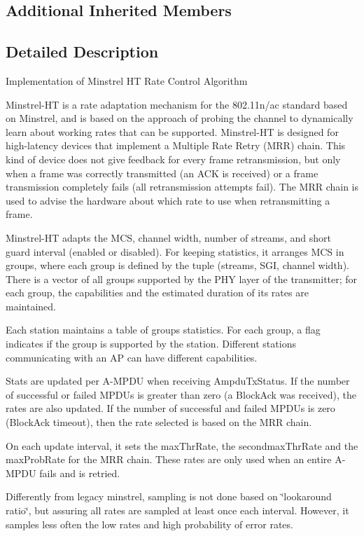 \subsection*{Additional Inherited Members}


\subsection{Detailed Description}
Implementation of Minstrel HT Rate Control Algorithm

Minstrel-\/\+HT is a rate adaptation mechanism for the 802.\+11n/ac standard based on Minstrel, and is based on the approach of probing the channel to dynamically learn about working rates that can be supported. Minstrel-\/\+HT is designed for high-\/latency devices that implement a Multiple Rate Retry (M\+RR) chain. This kind of device does not give feedback for every frame retransmission, but only when a frame was correctly transmitted (an A\+CK is received) or a frame transmission completely fails (all retransmission attempts fail). The M\+RR chain is used to advise the hardware about which rate to use when retransmitting a frame. 

Minstrel-\/\+HT adapts the M\+CS, channel width, number of streams, and short guard interval (enabled or disabled). For keeping statistics, it arranges M\+CS in groups, where each group is defined by the tuple (streams, S\+GI, channel width). There is a vector of all groups supported by the P\+HY layer of the transmitter; for each group, the capabilities and the estimated duration of its rates are maintained.

Each station maintains a table of groups statistics. For each group, a flag indicates if the group is supported by the station. Different stations communicating with an AP can have different capabilities.

Stats are updated per A-\/\+M\+P\+DU when receiving Ampdu\+Tx\+Status. If the number of successful or failed M\+P\+D\+Us is greater than zero (a Block\+Ack was received), the rates are also updated. If the number of successful and failed M\+P\+D\+Us is zero (Block\+Ack timeout), then the rate selected is based on the M\+RR chain.

On each update interval, it sets the max\+Thr\+Rate, the secondmax\+Thr\+Rate and the max\+Prob\+Rate for the M\+RR chain. These rates are only used when an entire A-\/\+M\+P\+DU fails and is retried.

Differently from legacy minstrel, sampling is not done based on \char`\"{}lookaround ratio\char`\"{}, but assuring all rates are sampled at least once each interval. However, it samples less often the low rates and high probability of error rates.

